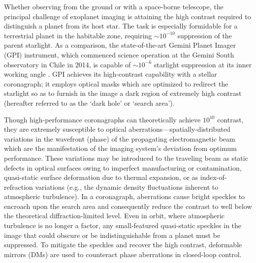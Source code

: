 \documentclass[11pt,reqno]{amsart}
\begin{document}
Whether observing from the ground or with a space-borne telescope, the principal challenge of exoplanet imaging is attaining the high contrast required to distinguish a planet from its host star.  The task is especially formidable for a terrestrial planet in the habitable zone, requiring $\sim\!\!10^{-10}$ suppression of the parent starlight.  As a comparison, the state-of-the-art Gemini Planet Imager (GPI) instrument, which commenced science operation at the Gemini South observatory in Chile in 2014, is capable of $\sim\!\!10^{-6}$ starlight suppression at its inner working angle \cite{Macintosh2014}.  GPI achieves its high-contrast capability with a stellar coronagraph; it employs optical masks which are optimized to redirect the starlight so as to furnish in the image a dark region of extremely high contrast (hereafter referred to as the `dark hole' or `search area').

Though high-performance coronagraphs can theoretically achieve $10^{10}$ contrast, they are extremely susceptible to optical aberrations---spatially-distributed variations in the wavefront (phase) of the propagating electromagnetic beam which are the manifestation of the imaging system's deviation from optimum performance.  These variations may be introduced to the traveling beam as static defects in optical surfaces owing to imperfect manufacturing or contamination, quasi-static surface deformation due to thermal expansion, or as index-of-refraction variations (e.g., the dynamic density fluctuations inherent to atmospheric turbulence).  In a coronagraph, aberrations cause bright speckles to encroach upon the search area and consequently reduce the contrast to well below the theoretical diffraction-limited level.  Even in orbit, where atmospheric turbulence is no longer a factor, any small-featured quasi-static speckles in the image that could obscure or be indistinguishable from a planet must be suppressed.  To mitigate the speckles and recover the high contrast, deformable mirrors (DMs) are used to counteract phase aberrations in closed-loop control.
\end{document}
